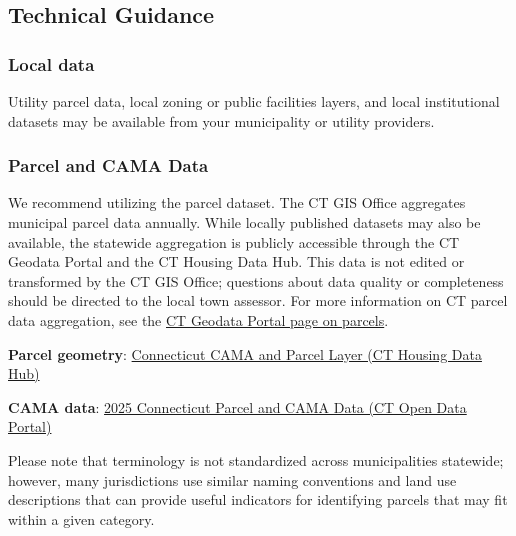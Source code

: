 \documentclass[
  letterpaper,
  DIV=11,
  numbers=noendperiod]{scrreprt}
\begin{document}
\subsection{Technical Guidance}\label{technical-guidance}

\subsubsection{Local data}\label{sec-local-data}

Utility parcel data, local zoning or public facilities layers, and local
institutional datasets may be available from your municipality or
utility providers.

\subsubsection{Parcel and CAMA Data}\label{sec-parcel-and-cama-data}

We recommend utilizing the parcel dataset. The CT GIS Office aggregates
municipal parcel data annually. While locally published datasets may
also be available, the statewide aggregation is publicly accessible
through the CT Geodata Portal and the CT Housing Data Hub. This data is
not edited or transformed by the CT GIS Office; questions about data
quality or completeness should be directed to the local town assessor.
For more information on CT parcel data aggregation, see the
\href{https://geodata.ct.gov/pages/parcels}{CT Geodata Portal page on
parcels}.

\textbf{Parcel geometry}:
\href{https://housingmaps.ct.gov/datasets/ctmaps::connecticut-cama-and-parcel-layer/about}{Connecticut
CAMA and Parcel Layer (CT Housing Data Hub)}

\textbf{CAMA data}:
\href{https://data.ct.gov/Local-Government/2025-Connecticut-Parcel-and-CAMA-Data/rny9-6ak2/about_data}{2025
Connecticut Parcel and CAMA Data (CT Open Data Portal)}

\begin{tcolorbox}[enhanced jigsaw, arc=.35mm, bottomrule=.15mm, breakable, colback=white, colframe=quarto-callout-warning-color-frame, left=2mm, leftrule=.75mm, opacityback=0, rightrule=.15mm, toprule=.15mm]

Please note that terminology is not standardized across municipalities
statewide; however, many jurisdictions use similar naming conventions
and land use descriptions that can provide useful indicators for
identifying parcels that may fit within a given category.

\end{tcolorbox}
\end{document}
